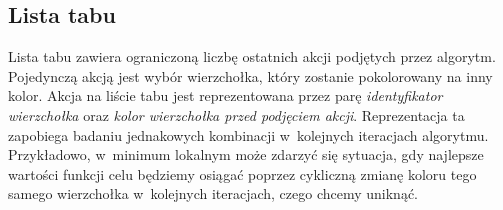 \subsection{Lista tabu}
Lista tabu zawiera ograniczoną liczbę ostatnich akcji podjętych przez algorytm.
Pojedynczą akcją jest wybór wierzchołka, który zostanie pokolorowany na inny kolor.
Akcja na liście tabu jest reprezentowana przez parę \emph{identyfikator wierzchołka} oraz \emph{kolor wierzchołka przed podjęciem akcji}. 
Reprezentacja ta zapobiega badaniu jednakowych kombinacji w~kolejnych iteracjach algorytmu. Przykładowo, w~minimum lokalnym może zdarzyć się sytuacja, gdy najlepsze wartości funkcji celu będziemy osiągać poprzez cykliczną zmianę koloru tego samego wierzchołka w~kolejnych iteracjach, czego chcemy uniknąć.